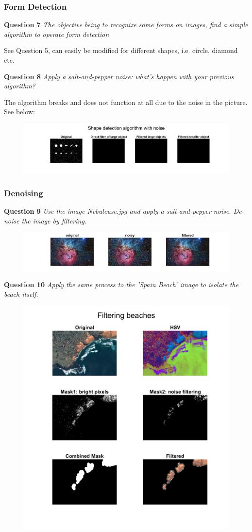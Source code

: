 \subsubsection{Form Detection}
\textbf{Question 7} \textit{The objective being to recognize some forms on images, ﬁnd a simple algorithm to operate form detection}

See Question 5, can easily be modified for different shapes, i.e. circle, diamond etc.


\textbf{Question 8} \textit{Apply a salt-and-pepper noise: what’s happen with your previous algorithm?}

The algorithm breaks and does not function at all due to the noise in the picture. See below:

\begin{figure}[H]
    \centering
    \includegraphics[width=\linewidth]{Doc/Graphics/Part2/part2_Q8.png}
\end{figure}


\subsubsection{Denoising}
\textbf{Question 9} \textit{Use the image Nebuleuse.jpg and apply a salt-and-pepper noise. De-noise the image by ﬁltering.}

\begin{figure}[H]
    \centering
    \includegraphics[width=\linewidth]{Doc/Graphics/Part2/part2_Q9.png}
\end{figure}

\textbf{Question 10} \textit{Apply the same process to the ’Spain Beach’ image to isolate the beach itself.}

\begin{figure}[H]
    \centering
    \includegraphics[width=0.5\linewidth]{Doc/Graphics/Part2/part2_Q10.png}
\end{figure}




